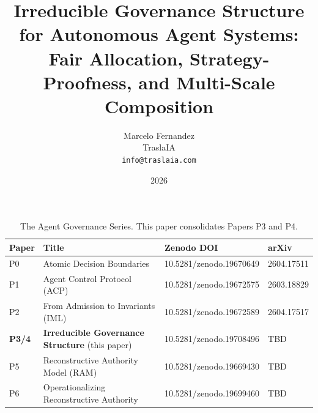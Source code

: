\documentclass[11pt]{article}
\begin{document}
\title{\textbf{Irreducible Governance Structure for Autonomous Agent Systems:\\
Fair Allocation, Strategy-Proofness, and Multi-Scale Composition}}

\author{Marcelo Fernandez\\
TraslaIA\\
\texttt{info@traslaia.com}}

\date{2026}

\maketitle

\begin{table}[h]
\centering
\small
\caption{The Agent Governance Series. This paper consolidates Papers P3 and P4.}
\label{tab:series}
\begin{tabular}{@{}llll@{}}
\toprule
\textbf{Paper} & \textbf{Title} & \textbf{Zenodo DOI} & \textbf{arXiv} \\
\midrule
P0   & Atomic Decision Boundaries~\cite{fernandez2026a}         & 10.5281/zenodo.19670649 & 2604.17511 \\
P1   & Agent Control Protocol (ACP)~\cite{fernandez2026b}       & 10.5281/zenodo.19672575 & 2603.18829 \\
P2   & From Admission to Invariants (IML)~\cite{fernandez2026c} & 10.5281/zenodo.19672589 & 2604.17517 \\
\textbf{P3/4} & \textbf{Irreducible Governance Structure} (this paper) & 10.5281/zenodo.19708496 & TBD \\
P5   & Reconstructive Authority Model (RAM)~\cite{fernandez2026ram} & 10.5281/zenodo.19669430 & TBD \\
P6   & Operationalizing Reconstructive Authority~\cite{fernandez2026op} & 10.5281/zenodo.19699460 & TBD \\
\bottomrule
\end{tabular}
\end{table}
\end{document}
